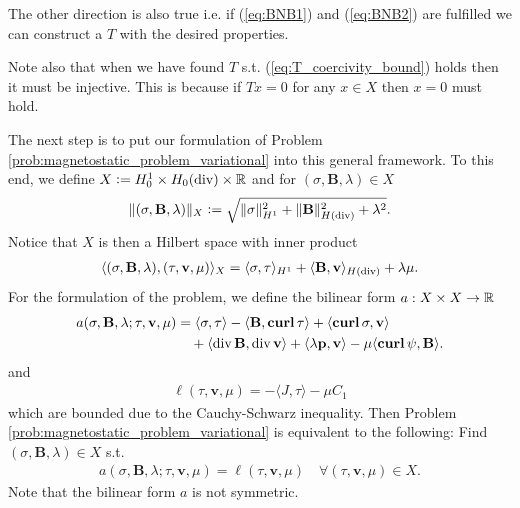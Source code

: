 \documentclass[../master_thesis.tex]{subfiles}
\begin{document}
\begin{remark}
    The other direction is also true i.e. if (\ref{eq:BNB1}) and (\ref{eq:BNB2}) 
    are fulfilled we can construct a $T$ with the desired properties.
\end{remark}

Note also that when we have found $T$ s.t. (\ref{eq:T_coercivity_bound}) holds 
then it must be injective. This is because if $Tx = 0$ for any 
$x \in X$ then $x=0$ must hold.

The next step is to put our formulation of
Problem \ref{prob:magnetostatic_problem_variational} into 
this general framework. To this end, 
we define $X \vcentcolon= H^1_0 \times H_0(\operatorname{div}) \times \mathbb{R}$
and for $(\sigma, \mathbf{B},\lambda) \in X$
\begin{align*}
    \lVert (\sigma, \mathbf{B}, \lambda) \rVert _X 
    \vcentcolon= \sqrt{\lVert \sigma \rVert^2_{H^1} + \lVert \mathbf{B} \rVert^2_{H(\operatorname{div})}
    + \lambda^2}.
\end{align*}
Notice that $X$ is then a Hilbert space with inner product 
\begin{align*}
    \langle (\sigma,\mathbf{B},\lambda), (\tau, \mathbf{v},\mu) \rangle _X 
    = \langle \sigma, \tau \rangle _{H^1} + \langle \mathbf{B}, \mathbf{v} \rangle _{H(\operatorname{div})} + \lambda \mu.
\end{align*}
For the formulation of the problem, we define the
bilinear form $a:X\times X \rightarrow \mathbb{R}$
\begin{align}
    a(\sigma,\mathbf{B}, \lambda;\tau,\mathbf{v},\mu) 
    &=   \langle \sigma, \tau \rangle - \langle \mathbf{B}, \veccurl\tau \rangle
        + \langle \veccurl\sigma, \mathbf{v} \rangle \notag
        \\ &\quad+ \langle \diver \mathbf{B}, \diver \mathbf{v} \rangle 
            + \langle \lambda \mathbf{p}, \mathbf{v} \rangle - \mu \langle \veccurl \psi, \mathbf{B} \rangle.
        \label{eq:definition_bilinear_form}
\end{align}
and 
\begin{align*}
    \ell(\tau,\mathbf{v},\mu) = -\langle J, \tau \rangle - \mu C_1
\end{align*}
which are bounded due to the Cauchy-Schwarz inequality.
Then Problem\,\ref{prob:magnetostatic_problem_variational}
is equivalent to the following: Find $(\sigma,\mathbf{B},\lambda) \in 
X$ s.t.
\begin{align*}
    a(\sigma,\mathbf{B},\lambda;\tau,\mathbf{v},\mu) = \ell(\tau,\mathbf{v},\mu)
        \quad \forall (\tau,\mathbf{v},\mu) \in X.
\end{align*}
Note that the bilinear form $a$ is not symmetric. 
\end{document}
